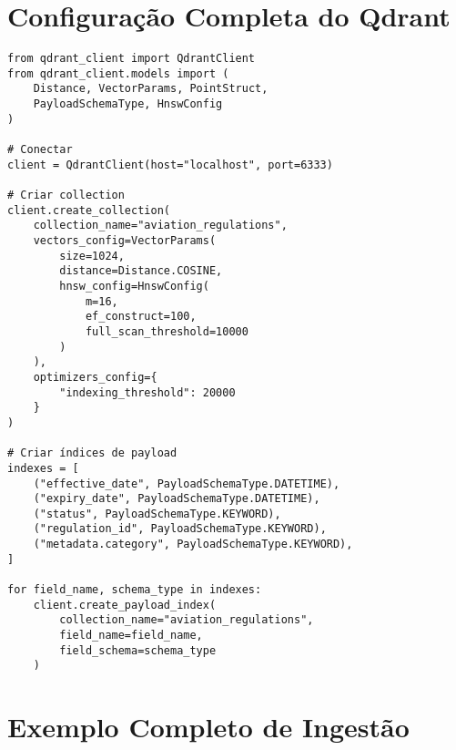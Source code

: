 \documentclass[12pt,a4paper]{article}
\begin{document}
\appendix

\section{Configuração Completa do Qdrant}

\begin{lstlisting}[caption={Complete Qdrant Setup}]
from qdrant_client import QdrantClient
from qdrant_client.models import (
    Distance, VectorParams, PointStruct,
    PayloadSchemaType, HnswConfig
)

# Conectar
client = QdrantClient(host="localhost", port=6333)

# Criar collection
client.create_collection(
    collection_name="aviation_regulations",
    vectors_config=VectorParams(
        size=1024,
        distance=Distance.COSINE,
        hnsw_config=HnswConfig(
            m=16,
            ef_construct=100,
            full_scan_threshold=10000
        )
    ),
    optimizers_config={
        "indexing_threshold": 20000
    }
)

# Criar índices de payload
indexes = [
    ("effective_date", PayloadSchemaType.DATETIME),
    ("expiry_date", PayloadSchemaType.DATETIME),
    ("status", PayloadSchemaType.KEYWORD),
    ("regulation_id", PayloadSchemaType.KEYWORD),
    ("metadata.category", PayloadSchemaType.KEYWORD),
]

for field_name, schema_type in indexes:
    client.create_payload_index(
        collection_name="aviation_regulations",
        field_name=field_name,
        field_schema=schema_type
    )
\end{lstlisting}

\section{Exemplo Completo de Ingestão}
\end{document}
